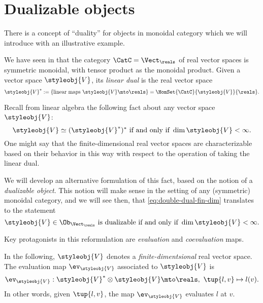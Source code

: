 

\section{Dualizable objects}
\label{sec:dual-objects}
There is a concept of ``duality'' for objects in monoidal category which we will introduce with an illustrative example.

We have seen in \XXX that the category $\CatC = \Vect_{\reals}$ of real vector spaces is symmetric monoidal, with tensor product as the monoidal product. Given a vector space $\styleobj{V} $, its \emph{linear dual} is the real vector space
\begin{equation}
    \label{eq:lin-dual-vecsp}
    \styleobj{V} ^{*} := \{ \text{linear maps } \styleobj{V} \mto \reals \} = \HomSet{\CatC}{\styleobj{V}}{ \reals}.
\end{equation}

Recall from linear algebra the following fact about any vector space $\styleobj{V} $:
\begin{equation}
    \label{eq:double-dual-fin-dim}
    \styleobj{V}  \simeq (\styleobj{V} ^{*})^* \text{ if and only if } \dim \styleobj{V}  < \infty.
\end{equation}
One might say that the finite-dimensional real vector spaces are characterizable based on their behavior in this way with respect to the operation of taking the linear dual.

We will develop an alternative formulation of this fact, based on the notion of a \emph{dualizable object}. This notion will make sense in the setting of any (symmetric) monoidal category, and we will see then, that \cref{eq:double-dual-fin-dim} translates to the statement
\begin{equation}
    \label{eq:dualizable-fin-dim}
    \styleobj{V}  \in \Ob_{\Vect_\reals} \text{ is dualizable if and only if } \dim \styleobj{V}  < \infty.
\end{equation}

Key protagonists in this reformulation are \emph{evaluation} and \emph{coevaluation} maps.

In the following,  $\styleobj{V} $ denotes a \emph{finite-dimentsional} real vector space. The evaluation map $\ev_\styleobj{V} $ associated to $\styleobj{V} $ is
\begin{equation}
    \label{eq:evaluation-vecsp}
    \ev_\styleobj{V}  : \styleobj{V}^* \otimes \styleobj{V}  \mto \reals, \ \tup{l, v} \mapsto l(v).
\end{equation}
In other words, given $\tup{l, v}$, the map $\ev_\styleobj{V} $ evaluates $l$ at $v$.


